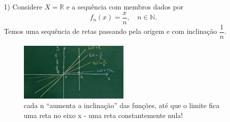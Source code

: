 \documentclass[../analysisII_notes.tex]{subfiles}
\begin{document}
\begin{example}
	\begin{itemize}
		\item[1)] Considere \(X = \mathbb{R}\) e a sequência com membros dados por
		      \[
			      f_{n}(x) = \frac{x}{n},\quad n\in \mathbb{N}.
		      \]
		      Temos uma sequência de retas passando pela origem e com inclinação \(\dfrac{1}{n}\).
		      \begin{figure}[H]
			      \begin{center}
				      \includegraphics[height=0.5\textheight, width=0.5\textwidth, keepaspectratio]{./Images/inclined_sequence_15.png}
			      \end{center}
			      \caption{cada n ``aumenta a inclinação'' das funções, até que o limite fica uma reta no eixo x - uma reta constantemente nula!}
			      \label{inc15}
		      \end{figure}
	\end{itemize}
\end{example}
\end{document}

